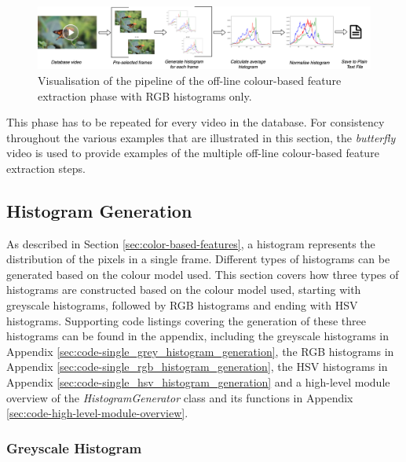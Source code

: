 \begin{figure}[h] 
\centerline{\includegraphics[width=1.2\textwidth,center]{figures/implementation/rgb_average_histogram_pipeline.png}}
\caption{\label{fig:implementation-rgb_average_histogram_pipeline}Visualisation of the pipeline of the off-line colour-based feature extraction phase with RGB histograms only.}
\end{figure}

This phase has to be repeated for every video in the database. For consistency throughout the various examples that are illustrated in this section, the \textit{butterfly} video is used to provide examples of the multiple off-line colour-based feature extraction steps.


\subsection{Histogram Generation}

As described in Section \ref{sec:color-based-features}, a histogram represents the distribution of the pixels in a single frame. Different types of histograms can be generated based on the colour model used. This section covers how three types of histograms are constructed based on the colour model used, starting with greyscale histograms, followed by RGB histograms and ending with HSV histograms. Supporting code listings covering the generation of these three histograms can be found in the appendix, including the greyscale histograms in Appendix \ref{sec:code-single_grey_histogram_generation}, the RGB histograms in Appendix \ref{sec:code-single_rgb_histogram_generation}, the HSV histograms in Appendix \ref{sec:code-single_hsv_histogram_generation} and a high-level module overview of the \textit{HistogramGenerator} class and its functions in Appendix \ref{sec:code-high-level-module-overview}.


\subsubsection{Greyscale Histogram}
\label{sec:implementation-greyscale-histogram}

